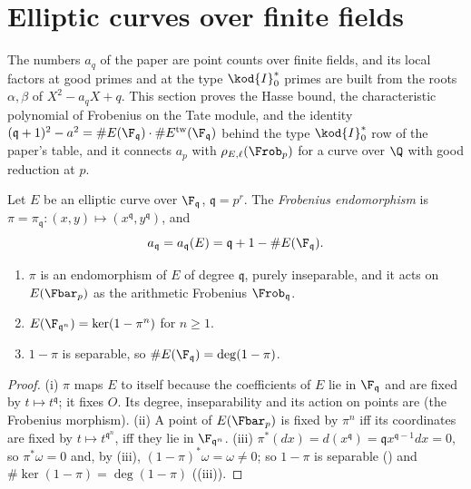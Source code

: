 \section{Elliptic curves over finite fields}\label{sec:ellcurves:finite}

The numbers $a_q$ of the paper are point counts over finite fields, and its local factors at good primes and at the type $\kod{I}_0^*$ primes are built from the roots $\alpha,\beta$ of
$X^2-a_qX+q$. This section proves the Hasse bound, the characteristic polynomial of Frobenius on the Tate module, and the identity
$(\mathfrak q+1)^2-a^2=\#E(\F_{\mathfrak q})\cdot\#E^{\mathrm{tw}}(\F_{\mathfrak q})$ behind the type $\kod{I}_0^*$ row of the paper's table, and it connects $a_p$ with $\rho_{E,\ell}(\Frob_p)$ for a
curve over $\Q$ with good reduction at $p$.

\begin{definition}\label{def:ellcurves:frobendo}
Let $E$ be an elliptic curve over $\F_{\mathfrak q}$, $\mathfrak q=p^r$. The \emph{Frobenius endomorphism} is $\pi=\pi_{\mathfrak q}\colon(x,y)\mapsto(x^{\mathfrak q},y^{\mathfrak q})$, and
\[
a_{\mathfrak q}=a_{\mathfrak q}(E)=\mathfrak q+1-\#E(\F_{\mathfrak q}).
\]
\end{definition}

\begin{proposition}[properties of $\pi$]\label{prop:ellcurves:frobendo}
\leavevmode
\begin{enumerate}[label=(\roman*)]
\item $\pi$ is an endomorphism of $E$ of degree $\mathfrak q$, purely inseparable, and it acts on $E(\Fbar_p)$ as the arithmetic Frobenius $\Frob_{\mathfrak q}$.
\item $E(\F_{\mathfrak q^n})=\ker(1-\pi^n)$ for $n\ge1$.
\item $1-\pi$ is separable, so $\#E(\F_{\mathfrak q})=\deg(1-\pi)$.
\end{enumerate}
\end{proposition}

\begin{proof}
(i) $\pi$ maps $E$ to itself because the coefficients of $E$ lie in $\F_{\mathfrak q}$ and are fixed by $t\mapsto t^{\mathfrak q}$; it fixes $O$. Its degree, inseparability and its action on points are
 (the Frobenius morphism). (ii) A point of $E(\Fbar_p)$ is fixed by $\pi^n$ iff its coordinates are fixed by $t\mapsto t^{\mathfrak q^n}$, iff they lie in $\F_{\mathfrak q^n}$. (iii)
$\pi^*(dx)=d(x^{\mathfrak q})=\mathfrak qx^{\mathfrak q-1}dx=0$, so $\pi^*\omega=0$ and, by (iii), $(1-\pi)^*\omega=\omega\ne0$; so $1-\pi$ is separable () and
$\#\ker(1-\pi)=\deg(1-\pi)$ ((iii)).
\end{proof}

